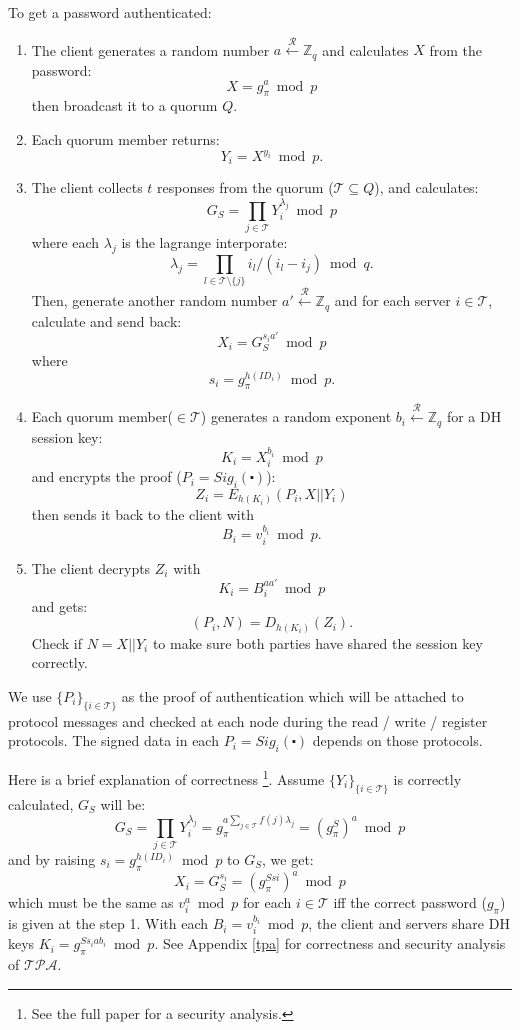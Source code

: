 To get a password authenticated:
\begin{enumerate}
\item The client generates a random number
  $a \xleftarrow{\mathcal{R}} \mathbb{Z}_q$
  and calculates $X$ from the password:
  \[
    X = g_{\pi}^a \bmod p
  \]
  then broadcast it to a quorum $Q$.

\item Each quorum member returns:
  \[
    Y_i = X^{y_i} \bmod p.
  \]

\item The client collects $t$ responses from the quorum ($\mathcal{T}
  \subseteq Q$), and
  calculates:
  \[
    G_S = \prod_{j \in \mathcal{T}}Y_i^{\lambda_j} \bmod p
  \]
  where each $\lambda_j$ is the lagrange interporate:
  \[
    \lambda_j = \prod_{l \in \mathcal{T} \setminus \{j\}}
    i_l / (i_l - i_j) \bmod q.
  \]
  Then, generate another random number $a' \xleftarrow{\mathcal{R}}
  \mathbb{Z}_q$ and for each server $i \in \mathcal{T}$, calculate and
  send back:
  \[
    X_i = G_S^{s_ia'} \bmod p
  \]
  where
  \[
    s_i = g_{\pi}^{h(ID_i)} \bmod p.
  \]

\item Each quorum member($\in \mathcal{T}$) generates a random exponent
  $b_i \xleftarrow{\mathcal{R}} \mathbb{Z}_q$
  for a DH session key:
  \[ K_i = X_i^{b_i} \bmod p \]
  and encrypts the proof ($P_i = Sig_i(\centerdot)$):
  \[
    Z_i = E_{h(K_i)}(P_i, X || Y_i)
  \]
  then sends it back to the client with
  \[
    B_i = v_i^{b_i} \bmod p.
  \]

\item The client decrypts $Z_i$ with
  \[
    K_i = B_i^{aa'} \bmod p
  \]
  and gets:
  \[
    (P_i, N) = D_{h(K_i)}(Z_i).
  \]
  Check if $N = X||Y_i$ to make sure both parties have shared the
  session key correctly. 
\end{enumerate}
We use $\{P_i\}_{\{i \in \mathcal{T}\}}$ as the proof of
authentication which will be attached to protocol messages and checked
at each node during the {\sf read / write / register} protocols. The
signed data in each $P_i = Sig_i(\centerdot)$ depends on those
protocols.

\ifdefined\ABSTRACT
Here is a brief explanation of correctness
\footnote{See the full paper for a security analysis.}.
Assume $\{Y_i\}_{\{i \in \mathcal{T}\}}$ is correctly calculated,
$G_S$ will be:
\[
  G_S = \prod_{j \in \mathcal{T}}Y_i^{\lambda_j} = g_{\pi}^{a \sum_{j
      \in \mathcal{T}} f(j) \lambda_j} = (g_{\pi}^S)^a \bmod p
\]
and by raising $s_i = g_{\pi}^{h(ID_i)} \bmod p$ to $G_S$, we get:
\[
  X_i = G_S^{s_i} = (g_{\pi}^{Ssi})^a \bmod p
\]
which must be the same as $v_i^a \bmod p$ for each $i \in
\mathcal{T}$ iff the correct password ($g_{\pi}$) is given at the
step 1. With each $B_i = v_i^{b_i} \bmod p$, the client and servers
share DH keys $K_i = g_{\pi}^{Ss_iab_i} \bmod p$.
\else
See Appendix \ref{tpa} for correctness and security analysis of
$\mathcal{TPA}$.
\fi

